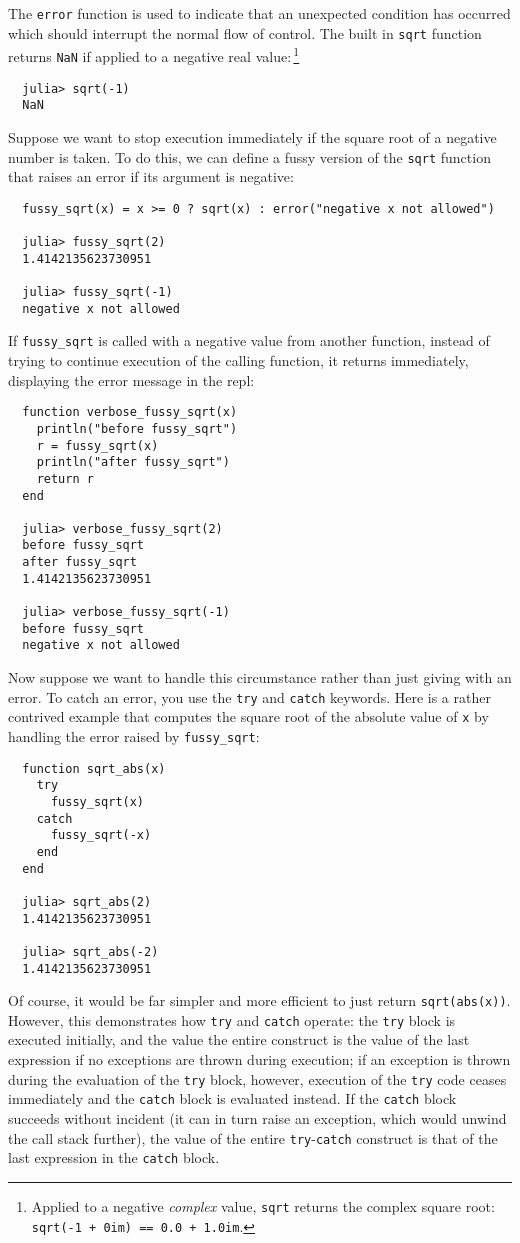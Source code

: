 \documentclass{article}
\begin{document}
The \verb|error| function is used to indicate that an unexpected condition has occurred which should interrupt the normal flow of control.
The built in \verb|sqrt| function returns \verb|NaN| if applied to a negative real value:\,\footnote{Applied to a negative \emph{complex} value, \texttt{sqrt} returns the complex square root: \texttt{sqrt(-1 + 0im) == 0.0 + 1.0im}.}
\begin{verbatim}
  julia> sqrt(-1)
  NaN
\end{verbatim}
Suppose we want to stop execution immediately if the square root of a negative number is taken.
To do this, we can define a fussy version of the \verb|sqrt| function that raises an error if its argument is negative:
\begin{verbatim}
  fussy_sqrt(x) = x >= 0 ? sqrt(x) : error("negative x not allowed")

  julia> fussy_sqrt(2)
  1.4142135623730951

  julia> fussy_sqrt(-1)
  negative x not allowed
\end{verbatim}
If \verb|fussy_sqrt| is called with a negative value from another function, instead of trying to continue execution of the calling function, it returns immediately, displaying the error message in the repl:
\begin{verbatim}
  function verbose_fussy_sqrt(x)
    println("before fussy_sqrt")
    r = fussy_sqrt(x)
    println("after fussy_sqrt")
    return r
  end

  julia> verbose_fussy_sqrt(2)
  before fussy_sqrt
  after fussy_sqrt
  1.4142135623730951

  julia> verbose_fussy_sqrt(-1)
  before fussy_sqrt
  negative x not allowed
\end{verbatim}
Now suppose we want to handle this circumstance rather than just giving with an error.
To catch an error, you use the \verb|try| and \verb|catch| keywords.
Here is a rather contrived example that computes the square root of the absolute value of \verb|x| by handling the error raised by \verb|fussy_sqrt|:
\begin{verbatim}
  function sqrt_abs(x)
    try
      fussy_sqrt(x)
    catch
      fussy_sqrt(-x)
    end
  end

  julia> sqrt_abs(2)
  1.4142135623730951

  julia> sqrt_abs(-2)
  1.4142135623730951
\end{verbatim}
Of course, it would be far simpler and more efficient to just return \verb|sqrt(abs(x))|.
However, this demonstrates how \verb|try| and \verb|catch| operate:
the \verb|try| block is executed initially, and the value the entire construct is the value of the last expression if no exceptions are thrown during execution;
if an exception is thrown during the evaluation of the \verb|try| block, however, execution of the \verb|try| code ceases immediately and the \verb|catch| block is evaluated instead.
If the \verb|catch| block succeeds without incident (it can in turn raise an exception, which would unwind the call stack further), the value of the entire \verb|try|-\verb|catch| construct is that of the last expression in the \verb|catch| block.
\end{document}
